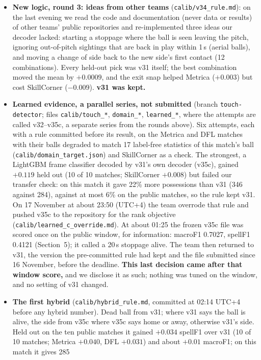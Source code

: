 \documentclass[11pt,a4paper]{article}
\newcommand{\code}[1]{\texttt{#1}}
\newcommand{\st}[1]{\textbf{#1}}
\begin{document}
\begin{itemize}
\item \st{New logic, round 3: ideas from other teams} (\code{calib/v34\_rule.md}): on the last evening we read the code and documentation (never data or results) of other teams' public repositories and re-implemented three ideas our decoder lacked: starting a stoppage where the ball is seen leaving the pitch, ignoring out-of-pitch sightings that are back in play within 1\,s (aerial balls), and moving a change of side back to the new side's first contact (12 combinations). Every held-out pick was v31 itself; the best combination moved the mean by $+0.0009$, and the exit snap helped Metrica ($+0.003$) but cost SkillCorner ($-0.009$). \textbf{v31 was kept.}
\item \st{Learned evidence, a parallel series, not submitted} (branch \code{touch-detector}; files \code{calib/touch\_*},
\code{domain\_*}, \code{learned\_*}, where the attempts are called v32--v35c, a separate series from the rounds
above). Six attempts, each with a rule committed before its result, on the Metrica and DFL matches with their
balls degraded to match 17 label-free statistics of this match's ball (\code{calib/domain\_target.json}) and
SkillCorner as a check. The strongest, a LightGBM frame classifier decoded by v31's own decoder (v35c), gained
$+0.119$ held out (10 of 10 matches; SkillCorner $+0.008$) but failed our transfer check: on this match it gave
22\% more possessions than v31 (346 against 284), against at most 6\% on the public matches, so the rule kept
v31. On 17 November at about 23:50 (UTC+4) the team overrode that rule and pushed v35c to the repository for
the rank objective (\code{calib/learned\_c\_override.md}). At about 01:25 the frozen v35c file was scored once
on the public window, for information: macroF1 0.7027, spellF1 0.4121 (Section~5); it called a 20\,s
stoppage alive. The team then returned to v31, the version the pre-committed rule had kept and the file
submitted since 16 November, before the deadline. \textbf{This last decision came after that window score,} and
we disclose it as such; nothing was tuned on the window, and no setting of v31 changed.
\item \st{The first hybrid} (\code{calib/hybrid\_rule.md}, committed at 02:14 UTC+4 before any
hybrid number). Dead ball from v31; where v31 says the ball is alive, the side from v35c where v35c says
home or away, otherwise v31's side. Held out on the ten public matches it gained $+0.034$ spellF1 over v31
(10 of 10 matches; Metrica $+0.040$, DFL $+0.031$) and about $+0.01$ macroF1; on this match it gives 285

\end{itemize}
\end{document}
